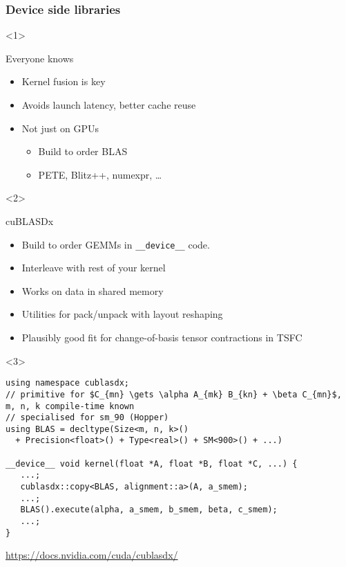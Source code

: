 \documentclass[aspectratio=169]{beamer}
\begin{document}
\begin{frame}[fragile]
  \frametitle{Device side libraries}
  \begin{onlyenv}<1>
    \begin{block}{Everyone knows}
      \begin{itemize}
      \item Kernel fusion is key
      \item Avoids launch latency, better cache reuse
      \item Not just on GPUs
        \begin{itemize}
        \item Build to order BLAS
        \item PETE, Blitz++, numexpr, \dots
        \end{itemize}
      \end{itemize}
    \end{block}
  \end{onlyenv}
  \begin{onlyenv}<2>
    \begin{block}{cuBLASDx}
      \begin{itemize}
      \item Build to order GEMMs in \verb~__device__~ code.
      \item Interleave with rest of your kernel
      \item Works on data in shared memory
      \item Utilities for pack/unpack with layout reshaping
      \item Plausibly good fit for change-of-basis tensor contractions in TSFC
      \end{itemize}
    \end{block}
  \end{onlyenv}
  \begin{onlyenv}<3>
\begin{verbatim}
using namespace cublasdx;
// primitive for $C_{mn} \gets \alpha A_{mk} B_{kn} + \beta C_{mn}$, m, n, k compile-time known
// specialised for sm_90 (Hopper)
using BLAS = decltype(Size<m, n, k>()
  + Precision<float>() + Type<real>() + SM<900>() + ...)

__device__ void kernel(float *A, float *B, float *C, ...) {
   ...; 
   cublasdx::copy<BLAS, alignment::a>(A, a_smem);
   ...;
   BLAS().execute(alpha, a_smem, b_smem, beta, c_smem);
   ...;
}
\end{verbatim}
    {
      \scriptsize
      \raggedleft
      \url{https://docs.nvidia.com/cuda/cublasdx/}
      \par
    }
  \end{onlyenv}
  

\end{frame}
\end{document}
